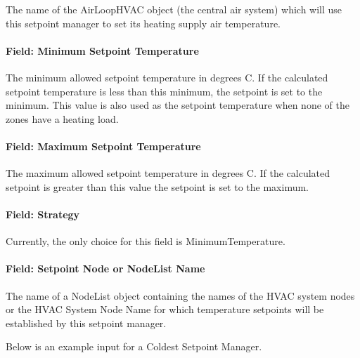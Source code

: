 The name of the AirLoopHVAC object (the central air system) which will use this setpoint manager to set its heating supply air temperature.

\paragraph{Field: Minimum Setpoint Temperature}\label{field-minimum-setpoint-temperature-2}

The minimum allowed setpoint temperature in degrees C. If the calculated setpoint temperature is less than this minimum, the setpoint is set to the minimum. This value is also used as the setpoint temperature when none of the zones have a heating load.

\paragraph{Field: Maximum Setpoint Temperature}\label{field-maximum-setpoint-temperature-2}

The maximum allowed setpoint temperature in degrees C. If the calculated setpoint is greater than this value the setpoint is set to the maximum.

\paragraph{Field: Strategy}\label{field-strategy-1}

Currently, the only choice for this field is MinimumTemperature.

\paragraph{Field: Setpoint Node or NodeList Name}\label{field-setpoint-node-or-nodelist-name-11}

The name of a NodeList object containing the names of the HVAC system nodes or the HVAC System Node Name for which temperature setpoints will be established by this setpoint manager.

Below is an example input for a Coldest Setpoint Manager.

